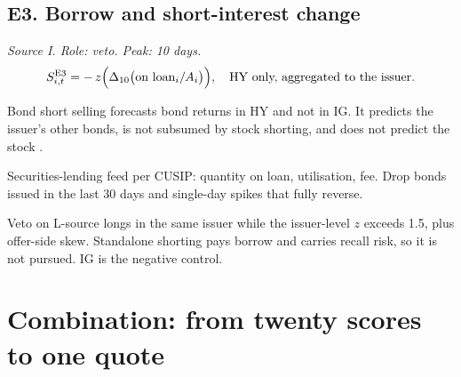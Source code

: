 \documentclass[11pt,letterpaper]{article}
\begin{document}
\subsection{E3. Borrow and short-interest change}
\emph{Source I. Role: veto. Peak: 10 days.}
\begin{equation}
S^{\mathrm{E3}}_{i,t}=-\,z\Bigl(\Delta_{10}\bigl(\text{on loan}_i/A_i\bigr)\Bigr),\quad\text{HY only, aggregated to the issuer.}
\end{equation}
\begin{spec}
\item[Mechanism and evidence.] Bond short selling forecasts bond returns in HY and not in IG. It predicts the issuer's other bonds, is not subsumed by stock shorting, and does not predict the stock \cite{hkr2020}.
\item[Build.] Securities-lending feed per CUSIP: quantity on loan, utilisation, fee. Drop bonds issued in the last 30 days and single-day spikes that fully reverse.
\item[Role in the quote.] Veto on L-source longs in the same issuer while the issuer-level $z$ exceeds 1.5, plus offer-side skew. Standalone shorting pays borrow and carries recall risk, so it is not pursued. IG is the negative control.
\end{spec}

\section{Combination: from twenty scores to one quote}
\label{sec:combination}
\end{document}
